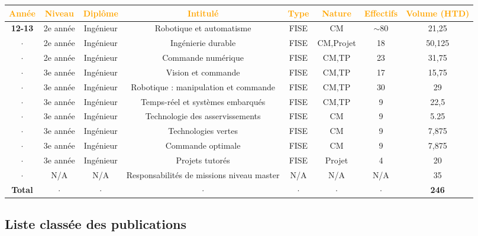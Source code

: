 \documentclass[a4paper,12pt]{article}
\begin{document}
\newpage

{\centering
\setlength{\tabcolsep}{2pt} %

\begin{tabular}{cccccccc} \toprule
    \textcolor{orange}{Année} & \textcolor{orange}{Niveau} & \textcolor{orange}{Diplôme} & \textcolor{orange}{Intitulé} & \textcolor{orange}{Type} & \textcolor{orange}{Nature} & \textcolor{orange}{Effectifs} & \textcolor{orange}{Volume (HTD)} \\ \midrule
  \bf{12-13} & 2e année  & Ingénieur & Robotique et automatisme & FISE & CM & \(\sim \)80 & 21,25 \\
 $\cdot$ & 2e année  & Ingénieur & Ingénierie durable  & FISE & CM,Projet & 18  & 50,125  \\
  $\cdot$ & 2e année  & Ingénieur & Commande numérique  & FISE & CM,TP & 23  & 31,75  \\
  $\cdot$ & 3e année  & Ingénieur & Vision et commande & FISE & CM,TP & 17 & 15,75  \\
  $\cdot$ & 3e année  & Ingénieur & Robotique : manipulation et commande & FISE & CM,TP & 30 & 29  \\
  $\cdot$ & 3e année  & Ingénieur & Temps-réel et systèmes embarqués & FISE & CM,TP & 9 & 22,5  \\
  $\cdot$ & 3e année  & Ingénieur & Technologie des asservissements & FISE & CM & 9 & 5.25  \\
  $\cdot$ & 3e année  & Ingénieur & Technologies vertes & FISE & CM & 9 & 7,875  \\
  $\cdot$ & 3e année  & Ingénieur & Commande optimale & FISE & CM & 9 & 7,875  \\
  $\cdot$ & 3e année  & Ingénieur & Projets tutorés & FISE & Projet & 4 & 20  \\
  $\cdot$ & N/A       & N/A       & Responsabilités de missions niveau master & N/A & N/A & N/A & 35  \\
  \bf{Total} & $\cdot$ & $\cdot$ & $\cdot$ & $\cdot$ & $\cdot$ & $\cdot$ &  {\bf 246} \\ \bottomrule
\end{tabular}

}

\newpage

\subsection{Liste classée des publications}
\end{document}
